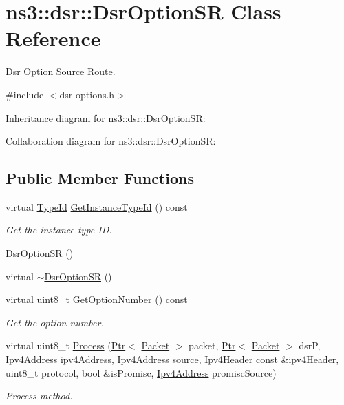 \hypertarget{classns3_1_1dsr_1_1DsrOptionSR}{}\section{ns3\+:\+:dsr\+:\+:Dsr\+Option\+SR Class Reference}
\label{classns3_1_1dsr_1_1DsrOptionSR}


Dsr Option Source Route.  




{\ttfamily \#include $<$dsr-\/options.\+h$>$}



Inheritance diagram for ns3\+:\+:dsr\+:\+:Dsr\+Option\+SR\+:


Collaboration diagram for ns3\+:\+:dsr\+:\+:Dsr\+Option\+SR\+:
\subsection*{Public Member Functions}
\begin{DoxyCompactItemize}
\item 
virtual \hyperlink{classns3_1_1TypeId}{Type\+Id} \hyperlink{classns3_1_1dsr_1_1DsrOptionSR_a3d8b49c988d45c920d152f13b3136f27}{Get\+Instance\+Type\+Id} () const 
\begin{DoxyCompactList}\small\item\em Get the instance type ID. \end{DoxyCompactList}\item 
\hyperlink{classns3_1_1dsr_1_1DsrOptionSR_a92535429fbbfd562e5b89013045feeee}{Dsr\+Option\+SR} ()
\item 
virtual \hyperlink{classns3_1_1dsr_1_1DsrOptionSR_a7f04f3ecb5a38e2a4e87eb787b0572d1}{$\sim$\+Dsr\+Option\+SR} ()
\item 
virtual uint8\+\_\+t \hyperlink{classns3_1_1dsr_1_1DsrOptionSR_af7744385f5b6ca437cbb9400a71235bd}{Get\+Option\+Number} () const 
\begin{DoxyCompactList}\small\item\em Get the option number. \end{DoxyCompactList}\item 
virtual uint8\+\_\+t \hyperlink{classns3_1_1dsr_1_1DsrOptionSR_a3136e1503dc9a7cb1f8294d929c4e349}{Process} (\hyperlink{classns3_1_1Ptr}{Ptr}$<$ \hyperlink{classns3_1_1Packet}{Packet} $>$ packet, \hyperlink{classns3_1_1Ptr}{Ptr}$<$ \hyperlink{classns3_1_1Packet}{Packet} $>$ dsrP, \hyperlink{classns3_1_1Ipv4Address}{Ipv4\+Address} ipv4\+Address, \hyperlink{classns3_1_1Ipv4Address}{Ipv4\+Address} source, \hyperlink{classns3_1_1Ipv4Header}{Ipv4\+Header} const \&ipv4\+Header, uint8\+\_\+t protocol, bool \&is\+Promisc, \hyperlink{classns3_1_1Ipv4Address}{Ipv4\+Address} promisc\+Source)
\begin{DoxyCompactList}\small\item\em Process method. \end{DoxyCompactList}\end{DoxyCompactItemize}
